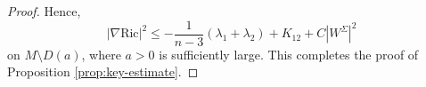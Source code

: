 \documentclass[10pt,a4paper]{amsart}
\begin{document}
\begin{proof}
	Hence,
	\[
	|\nabla \mathrm{Ric}|^2 \leq -\frac{1}{n-3}(\lambda_1+\lambda_2) + K_{12} + C|W^{\Sigma}|^2
	\]
	on $M \setminus D(a)$, where $a > 0$ is sufficiently large. This completes the proof of Proposition \ref{prop:key-estimate}.
\end{proof}
\end{document}
